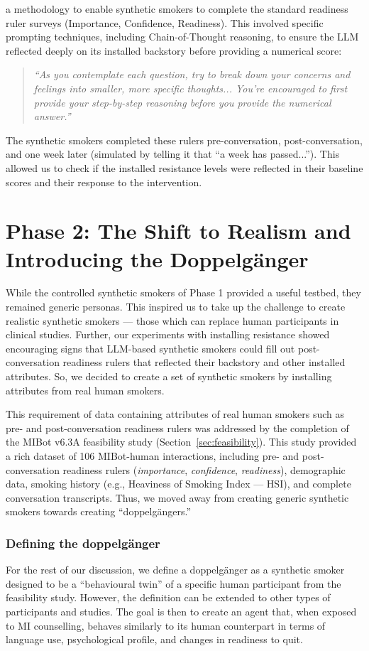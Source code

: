 a methodology to enable synthetic smokers to complete the standard readiness ruler surveys (Importance, Confidence, Readiness). This involved specific prompting techniques, including Chain-of-Thought reasoning, to ensure the LLM reflected deeply on its installed backstory before providing a numerical score:

\begin{quote}
    \textit{``As you contemplate each question, try to break down your concerns and feelings into smaller, more specific thoughts... You're encouraged to first provide your step-by-step reasoning before you provide the numerical answer.''}
\end{quote}


The synthetic smokers completed these rulers pre-conversation, post-conversation, and one week later (simulated by telling it that ``a week has passed...''). This allowed us to check if the installed resistance levels were reflected in their baseline scores and their response to the intervention.


\section{Phase 2: The Shift to Realism and Introducing the Doppelgänger}
While the controlled synthetic smokers of Phase 1 provided a useful testbed, they remained generic personas. This inspired us to take up the challenge to create realistic synthetic smokers --- those which can replace human participants in clinical studies. Further, our experiments with installing resistance showed encouraging signs that LLM-based synthetic smokers could fill out post-conversation readiness rulers that reflected their backstory and other installed attributes. So, we decided to create a set of synthetic smokers by installing attributes from real human smokers.


This requirement of data containing attributes of real human smokers  such as pre- and post-conversation readiness rulers was addressed by the completion of the MIBot v6.3A feasibility study (Section~\ref{sec:feasibility}). This study provided a rich dataset of 106 MIBot-human interactions, including pre- and post-conversation readiness rulers (\emph{importance}, \emph{confidence}, \emph{readiness}), demographic data, smoking history (e.g., Heaviness of Smoking Index --- HSI), and complete conversation transcripts. Thus, we moved away from creating generic synthetic smokers towards creating ``doppelgängers.''

\subsubsection*{Defining the doppelgänger}
For the rest of our discussion, we define a doppelgänger as a synthetic smoker designed to be a ``behavioural twin'' of a specific human participant from the feasibility study. However, the definition can be extended to other types of participants and studies. The goal is then to create an agent that, when exposed to MI counselling, behaves similarly to its human counterpart in terms of language use, psychological profile, and changes in readiness to quit.



